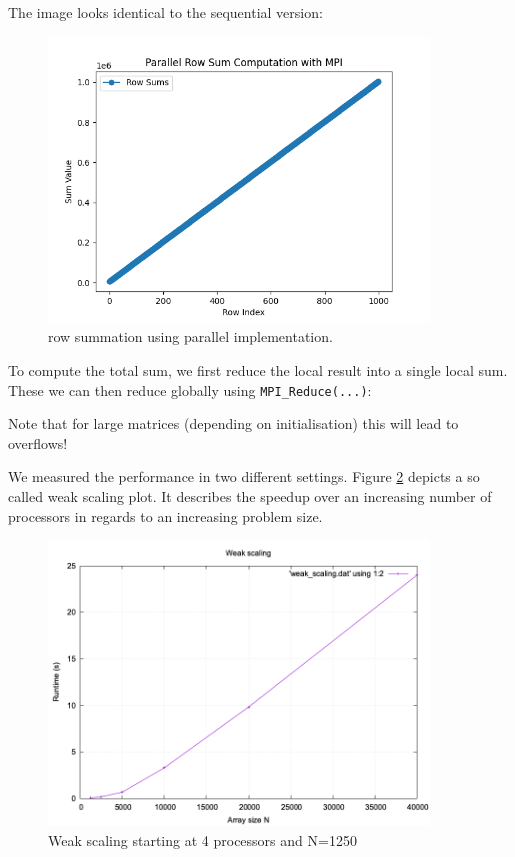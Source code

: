 \documentclass[a4paper,10pt]{article}
\begin{document}
The image looks identical to the sequential version:
\begin{figure}[H]
  \centering
  \includegraphics[width=0.9\textwidth]{img/ex2_para}
  \caption{row summation using parallel implementation.}
  \label{fig:ex2_seq}
\end{figure}

To compute the total sum, we first reduce the local result into a single local sum.
These we can then reduce globally using \verb|MPI_Reduce(...)|:

Note that for large matrices (depending on initialisation) this will lead to overflows!

We measured the performance in two different settings.
Figure \ref{fig:ex2_weak_scaling} depicts a so called weak scaling plot.
It describes the speedup over an increasing number of processors in regards to an increasing problem size.

\begin{figure}[H]
  \centering
  \includegraphics[width=0.9\textwidth]{img/ex2_weak_scaling}
  \caption{Weak scaling starting at 4 processors and N=1250}
  \label{fig:ex2_weak_scaling}
\end{figure}
\end{document}

